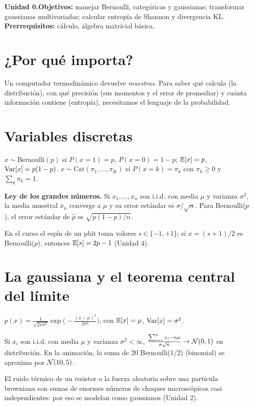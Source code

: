 \documentclass[11pt,a4paper]{article}
\begin{document}

\noindent\textbf{Unidad 0.}\quad\textbf{Objetivos:} manejar Bernoulli, categóricas y gaussianas; transformar
gaussianas multivariadas; calcular entropía de Shannon y divergencia KL. \textbf{Prerrequisitos:} cálculo,
álgebra matricial básica.

\section{¿Por qué importa?}
Un computador termodinámico devuelve \emph{muestras}. Para saber qué calcula (la distribución), con qué
precisión (sus momentos y el error de promediar) y cuánta información contiene (entropía), necesitamos el
lenguaje de la probabilidad.

\section{Variables discretas}
\begin{definicion}
$x\sim\mathrm{Bernoulli}(p)$ si $P(x=1)=p$, $P(x=0)=1-p$; $\mathbb{E}[x]=p$, $\operatorname{Var}[x]=p(1-p)$.
$x\sim\mathrm{Cat}(\pi_1,\dots,\pi_K)$ si $P(x=k)=\pi_k$ con $\pi_k\ge0$ y $\sum_k\pi_k=1$.
\end{definicion}
\textbf{Ley de los grandes números.} Si $x_1,\dots,x_n$ son i.i.d. con media $\mu$ y varianza $\sigma^2$, la
media muestral $\bar x_n$ converge a $\mu$ y su error estándar es $\sigma/\sqrt n$. Para Bernoulli($p$), el
error estándar de $\hat p$ es $\sqrt{p(1-p)/n}$.

En el curso el espín de un pbit toma valores $s\in\{-1,+1\}$; si $x=(s+1)/2$ es Bernoulli($p$), entonces
$\mathbb{E}[s]=2p-1$ (Unidad 4).

\section{La gaussiana y el teorema central del límite}
\begin{definicion}
$p(x)=\frac{1}{\sqrt{2\pi\sigma^2}}\exp\!\big(-\frac{(x-\mu)^2}{2\sigma^2}\big)$, con $\mathbb{E}[x]=\mu$, $\operatorname{Var}[x]=\sigma^2$.
\end{definicion}
\begin{resultado}[ (TCL)]
Si $x_i$ son i.i.d. con media $\mu$ y varianza $\sigma^2<\infty$, $\frac{\sum_{i=1}^n x_i-n\mu}{\sigma\sqrt n}\to\mathcal{N}(0,1)$
en distribución. En la animación, la suma de 20 Bernoulli(1/2) (binomial) se aproxima por $\mathcal{N}(10,5)$.
\end{resultado}
El ruido térmico de un resistor o la fuerza aleatoria sobre una partícula browniana son sumas de enormes
números de choques microscópicos casi independientes: por eso se modelan como gaussianos (Unidad 2).
\end{document}
